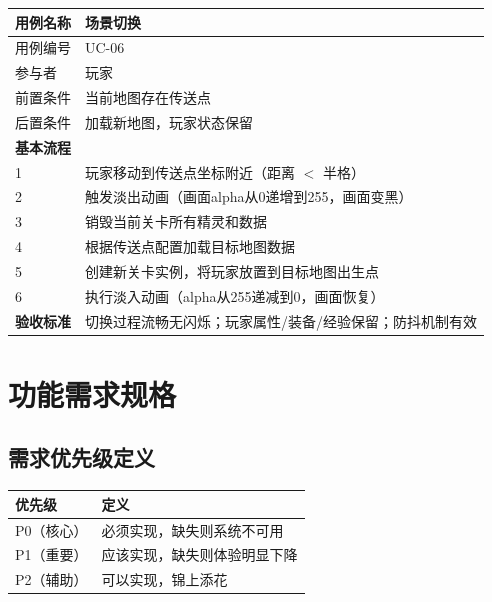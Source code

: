 \documentclass[12pt,a4paper]{article}
\begin{document}
\begin{table}[htbp]
\centering
\begin{tabularx}{\textwidth}{lX}
\toprule
\textbf{用例名称} & 场景切换 \\
\midrule
用例编号 & UC-06 \\
参与者 & 玩家 \\
前置条件 & 当前地图存在传送点 \\
后置条件 & 加载新地图，玩家状态保留 \\
\midrule
\textbf{基本流程} & \\
1 & 玩家移动到传送点坐标附近（距离 $<$ 半格） \\
2 & 触发淡出动画（画面alpha从0递增到255，画面变黑） \\
3 & 销毁当前关卡所有精灵和数据 \\
4 & 根据传送点配置加载目标地图数据 \\
5 & 创建新关卡实例，将玩家放置到目标地图出生点 \\
6 & 执行淡入动画（alpha从255递减到0，画面恢复） \\
\midrule
\textbf{验收标准} & 切换过程流畅无闪烁；玩家属性/装备/经验保留；防抖机制有效 \\
\bottomrule
\end{tabularx}
\end{table}


\section{功能需求规格}

\subsection{需求优先级定义}

\begin{table}[htbp]
\centering
\begin{tabularx}{\textwidth}{lX}
\toprule
\textbf{优先级} & \textbf{定义} \\
\midrule
P0（核心） & 必须实现，缺失则系统不可用 \\
P1（重要） & 应该实现，缺失则体验明显下降 \\
P2（辅助） & 可以实现，锦上添花 \\
\bottomrule
\end{tabularx}
\end{table}
\end{document}
